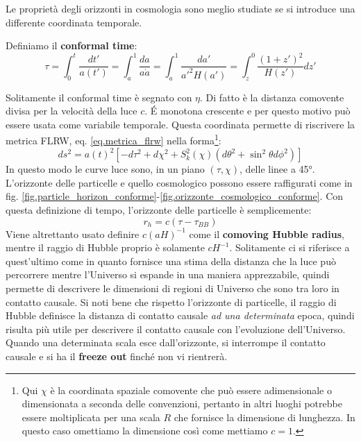 Le proprietà degli orizzonti in cosmologia sono meglio studiate se si introduce una differente coordinata temporale.
\begin{definizione}
    Definiamo il \textbf{conformal time}:
    \begin{equation}
        \tau = \int^t_0 \frac{dt'}{a(t')} = \int_a^1 \frac{da}{a \Dot{a}} = \int_a^1\frac{da'}{a'^2 H(a')} = \int_z^0 \frac{(1+z')^2}{H(z')}dz'
        \label{eq.conformal_time}
    \end{equation}
\end{definizione}
Solitamente il conformal time è segnato con $\eta$. Di fatto è la distanza comovente divisa per la velocità della luce $c$. \'E monotona crescente e per questo motivo può essere usata come variabile temporale.
Questa coordinata permette di riscrivere la metrica FLRW, eq. \ref{eq.metrica_flrw} nella forma\footnote{Qui $\chi$ è la coordinata spaziale comovente che può essere adimensionale o dimensionata a seconda delle convenzioni, pertanto in altri luoghi potrebbe essere moltiplicata per una scala $R$ che fornisce la dimensione di lunghezza. In questo caso omettiamo la dimensione così come mettiamo $c=1$.}:
\begin{equation}
    ds^2 = a(t)^2\left[ - d\tau^2 + d\chi^2 + S_k^2(\chi)(d\theta^2 + \sin^2\theta d\phi^2)\right]
    \label{eq.metrica_flrw_conformal_time}
\end{equation}
In questo modo le curve luce sono, in un piano $(\tau, \chi)$,  delle linee a 45°. L'orizzonte delle particelle e quello cosmologico possono essere raffigurati come in fig. \ref{fig.particle_horizon_conforme}-\ref{fig.orizzonte_cosmologico_conforme}. Con questa definizione di tempo, l'orizzonte delle particelle è semplicemente:
\begin{equation*}
    r_{h} = c(\tau - \tau_{BB})
\end{equation*}
Viene altrettanto usato definire $c(aH)^{-1}$  come il \textbf{comoving Hubble radius}, mentre il raggio di Hubble proprio è solamente $cH^{-1}$. Solitamente ci si riferisce a quest'ultimo come  in quanto fornisce una stima della distanza che la luce può percorrere mentre l'Universo si espande in una maniera apprezzabile, quindi permette di descrivere le dimensioni di regioni di Universo che sono tra loro in contatto causale. Si noti bene che rispetto l'orizzonte di particelle, il raggio di Hubble definisce la distanza di contatto causale \emph{ad una determinata} epoca, quindi risulta più utile per descrivere il contatto causale con l'evoluzione dell'Universo. Quando una determinata scala esce dall'orizzonte, si interrompe il contatto causale e si ha il \textbf{freeze out} finché non vi rientrerà.

